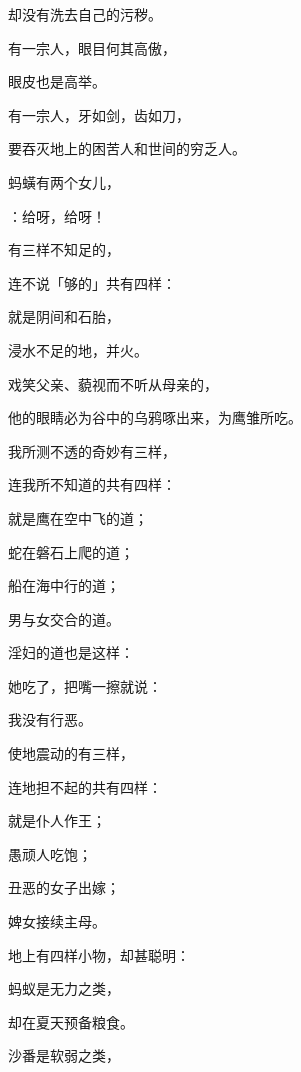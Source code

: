 {\par }{\Q 却没有洗去自己的污秽。
\par }{\Q {}有一宗人，眼目何其高傲，
\par }{\Q 眼皮也是高举。
\par }{\Q {}有一宗人，牙如剑，齿如刀，
\par }{\Q 要吞灭地上的困苦人和世间的穷乏人。
\par }{\BB \par }{\Q {}蚂蟥有两个女儿，
\par }{：给呀，给呀！
\par }{\Q 有三样不知足的，
\par }{\Q 连不说「够的」共有四样：
\par }{\Q {}就是阴间和石胎，
\par }{\Q 浸水不足的地，并火。
\par }{\BB \par }{\Q {}戏笑父亲、藐视而不听从母亲的，
\par }{\Q 他的眼睛必为谷中的乌鸦啄出来，为鹰雏所吃。
\par }{\BB \par }{\Q {}我所测不透的奇妙有三样，
\par }{\Q 连我所不知道的共有四样：
\par }{\Q {}就是鹰在空中飞的道；
\par }{\Q 蛇在磐石上爬的道；
\par }{\Q 船在海中行的道；
\par }{\Q 男与女交合的道。
\par }{\Q {}淫妇的道也是这样：
\par }{\Q 她吃了，把嘴一擦就说：
\par }{\Q 我没有行恶。
\par }{\BB \par }{\Q {}使地震动的有三样，
\par }{\Q 连地担不起的共有四样：
\par }{\Q {}就是仆人作王；
\par }{\Q 愚顽人吃饱；
\par }{\Q {}丑恶的女子出嫁；
\par }{\Q 婢女接续主母。
\par }{\BB \par }{\Q {}地上有四样小物，却甚聪明：
\par }{\Q {}蚂蚁是无力之类，
\par }{\Q 却在夏天预备粮食。
\par }{\Q {}沙番是软弱之类，
}
